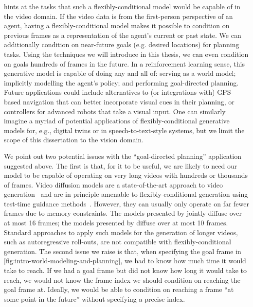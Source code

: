  hints at the tasks that such a flexibly-conditional model would be capable of in the video domain. If the video data is from the first-person perspective of an agent, having a flexibly-conditional model makes it possible to condition on previous frames as a representation of the agent's current or past state. We can additionally condition on near-future goals (e.g. desired locations) for planning tasks. Using the techniques we will introduce in this thesis, we can even condition on goals hundreds of frames in the future. In a reinforcement learning sense, this generative model is capable of doing any and all of: serving as a world model; implicitly modelling the agent's policy; and performing goal-directed planning. Future applications could include alternatives to (or integrations with) GPS-based navigation that can better incorporate visual cues in their planning, or controllers for advanced robots that take a visual input. One can similarly imagine a myriad of potential applications of flexibly-conditional generative models for, e.g., digital twins or in speech-to-text-style systems, but we limit the scope of this dissertation to the vision domain.

We point out two potential issues with the ``goal-directed planning'' application suggested above. The first is that, for it to be useful, we are likely to need our model to be capable of operating on very long videos with hundreds or thousands of frames. Video diffusion models are a state-of-the-art approach to video generation~\citep{ho2022video,blattmann2023align,brooks2024video} and are in principle amenable to flexibly-conditional generation using test-time guidance methods~\citep{ho2022video}. However, they can usually only operate on far fewer frames due to memory constraints. The models presented by \citet{ho2022video} jointly diffuse over at most 16 frames; the models presented by \citet{blattmann2023align} diffuse over at most 10 frames. Standard approaches to apply such models for the generation of longer videos, such as autoregressive roll-outs, are not compatible with flexibly-conditional generation. The second issue we raise is that, when specifying the goal frame in \cref{fig:intro-world-modeling-and-planning}, we had to know how much time it would take to reach. If we had a goal frame but did not know how long it would take to reach, we would not know the frame index we should condition on reaching the goal frame at. Ideally, we would be able to condition on reaching a frame ``at some point in the future'' without specifying a precise index.

